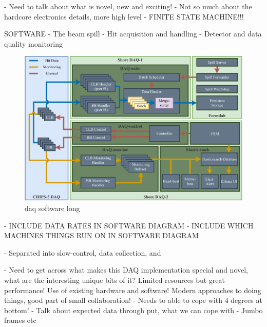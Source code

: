 - Need to talk about what is novel, new and exciting!
- Not so much about the hardcore electronics details, more high level
- FINITE STATE MACHINE!!!

SOFTWARE
- The beam spill
- Hit acquisition and handling
- Detector and data quality monitoring

\begin{figure} %
    \includegraphics[width=\textwidth]{diagrams/5-daq/daq_software.pdf}
    \caption[daq software short]
    {daq software long}
    \label{fig:daq_software}
\end{figure}

- INCLUDE DATA RATES IN SOFTWARE DIAGRAM
- INCLUDE WHICH MACHINES THINGS RUN ON IN SOFTWARE DIAGRAM

- Separated into slow-control, data collection, and

- Need to get across what makes this DAQ implementation special and novel, what are the
interesting unique bits of it? Limited resources but great performance! Use of existing hardware
and software! Modern approaches to doing things, good part of small collaboration!
- Needs to able to cope with 4 degrees at bottom!
- Talk about expected data through put, what we can cope with
- Jumbo frames etc

